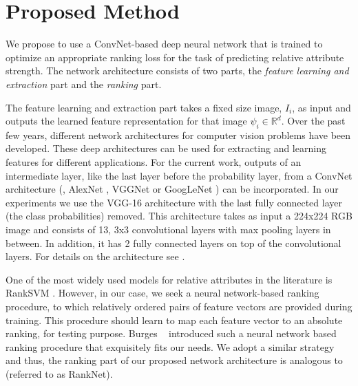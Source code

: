 \section{Proposed Method}
\label{sec.3}

We propose to use a ConvNet-based deep neural network that is trained to optimize an appropriate ranking loss for the task of predicting relative attribute strength. The network architecture consists of two parts, the \textit{feature learning and extraction} part and the \textit{ranking} part.

The feature learning and extraction part takes a fixed size image, $I_i$, as input and outputs the learned feature representation for that image $\psi_i \in \mathbb{R}^d$.
Over the past few years, different network architectures for computer vision problems have been developed. These deep architectures can be used for extracting and learning features for different applications.
For the current work, outputs of an intermediate layer, like the last layer before the probability layer, from a ConvNet architecture (\eg, AlexNet \cite{Krizhevsky2012ImageNetCW}, VGGNet \cite{verydeep} or GoogLeNet \cite{googlenet}) can be incorporated. %
In our experiments we use the VGG-16 architecture \cite{verydeep} with the last fully connected layer (the class probabilities) removed. This architecture takes as input a 224x224 RGB image and consists of 13, 3x3 convolutional layers with max pooling layers in between. In addition, it has 2 fully connected layers on top of the convolutional layers. For details on the architecture see \cite{verydeep}.

One of the most widely used models for relative attributes in the literature is RankSVM \cite{Joachims2002}. However,
in our case, we seek a neural network-based ranking procedure, to which relatively ordered pairs of feature vectors are provided during training. This procedure should learn to map each feature vector to an absolute ranking, for testing purpose. Burges \etal~\cite{Burges2005} introduced such a neural network based ranking procedure that exquisitely fits our needs. %
We adopt a similar strategy and thus, the ranking part of our proposed network architecture is analogous to \cite{Burges2005} (referred to as RankNet).

